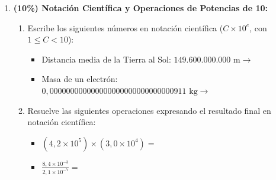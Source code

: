 \documentclass[11pt, letterpaper]{article}
\newif\ifshowanswers
\newcommand{\answer}[1]{
	\ifshowanswers
	\par\vspace{0.15cm}
	\begin{tcolorbox}[colback=blue!5!white, colframe=blue!60!white, arc=1mm, boxrule=0.5pt, title=\textbf{\footnotesize SOLUCIÓN PASO A PASO (DOCENTE)}]
		\color{blue!80!black}\footnotesize #1
	\end{tcolorbox}
	\par\vspace{0.15cm}
	\else
	\par\vspace{0.3cm}
	\fi
}
\begin{document}
\begin{enumerate}[leftmargin=*, itemsep=0.8cm]
		\item \textbf{(10\%) Notación Científica y Operaciones de Potencias de 10:}
		\begin{enumerate}[label=\alph*), itemsep=0.2cm]
			\item Escribe los siguientes números en notación científica ($C \times 10^e$, con $1 \le C < 10$):
			\begin{itemize}[itemsep=0.1cm]
				\item Distancia media de la Tierra al Sol: $149.600.000.000\text{ m} \rightarrow$ \underline{\hspace{4cm}}
				\item Masa de un electrón: \\ $0,000000000000000000000000000000911\text{ kg} \rightarrow$ \underline{\hspace{4cm}}
			\end{itemize}
			\item Resuelve las siguientes operaciones expresando el resultado final en notación científica:
			\begin{itemize}[itemsep=0.15cm]
				\item $(4,2 \times 10^5) \times (3,0 \times 10^4) = $ \underline{\hspace{4cm}}
				\item $\frac{8,4 \times 10^{-3}}{2,1 \times 10^{-7}} = $ \underline{\hspace{4cm}}
			\end{itemize}
		\end{enumerate}
		
		\answer{
			\textbf{Soluciones en notación científica:}
			\begin{itemize}[itemsep=0.15cm]
				\item \textbf{a)} 
				\begin{itemize}
					\item $149.600.000.000\text{ m} = \mathbf{1,496 \times 10^{11}\text{ m}}$.
					\item $0,000000000000000000000000000000911\text{ kg} = \mathbf{9,11 \times 10^{-31}\text{ kg}}$.
				\end{itemize}
				\item \textbf{b)}
				\begin{itemize}
					\item $(4,2 \times 3,0) \times 10^{5+4} = 12,6 \times 10^9 = \mathbf{1,26 \times 10^{10}}$.
					\item $\left(\frac{8,4}{2,1}\right) \times 10^{-3 - (-7)} = 4,0 \times 10^{-3 + 7} = \mathbf{4,0 \times 10^4}$.
				\end{itemize}
			\end{itemize}
		}
		

\end{enumerate}
\end{document}

